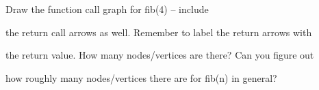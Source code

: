 Draw the function call graph for fib(4) -- include

the return call arrows as well. Remember to label the return arrows with

the return value. How many nodes/vertices are there? Can you figure out

how roughly many nodes/vertices there are for fib(n) in general?

